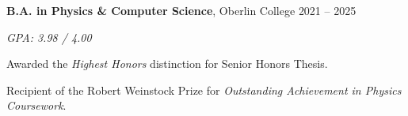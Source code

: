 \begin{entry}
	{{\bf B.A. in Physics \& Computer Science}, Oberlin College}
	{2021 -- 2025}

	{\em GPA: 3.98 / 4.00}

	Awarded the {\em Highest Honors} distinction for Senior Honors Thesis.

	Recipient of the Robert Weinstock Prize for {\em Outstanding Achievement in Physics Coursework}.
\end{entry}
